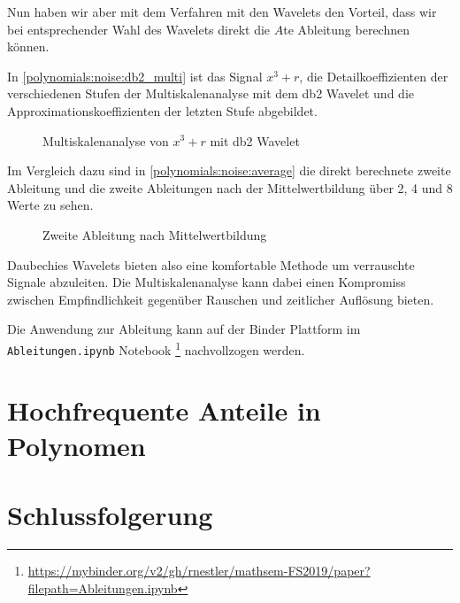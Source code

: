 \begin{refsection}
Nun haben wir aber mit dem Verfahren mit den Wavelets den Vorteil, dass wir bei
entsprechender Wahl des Wavelets direkt die $A$te Ableitung berechnen können.

In \autoref{polynomials:noise:db2_multi} ist das Signal $x^3 + r$, die
Detailkoeffizienten der verschiedenen Stufen der Multiskalenanalyse mit dem db2
Wavelet und die Approximationskoeffizienten der letzten Stufe abgebildet.

\begin{figure}
    \centering
    
    \caption{Multiskalenanalyse von $x^3 + r$ mit db2 Wavelet\label{polynomials:noise:db2_multi}}
\end{figure}

Im Vergleich dazu sind in \autoref{polynomials:noise:average} die direkt
berechnete zweite Ableitung und die zweite Ableitungen nach der
Mittelwertbildung über 2, 4 und 8 Werte zu sehen.

\begin{figure}
    \centering
    
    \caption{Zweite Ableitung nach Mittelwertbildung\label{polynomials:noise:average2nd}}
\end{figure}

Daubechies Wavelets bieten also eine komfortable Methode um verrauschte Signale
abzuleiten. Die Multiskalenanalyse kann dabei einen Kompromiss zwischen
Empfindlichkeit gegenüber Rauschen und zeitlicher Auflösung bieten.

Die Anwendung zur Ableitung kann auf der Binder Plattform im
\texttt{Ableitungen.ipynb} Notebook%
\footnote{\url{https://mybinder.org/v2/gh/rnestler/mathsem-FS2019/paper?filepath=Ableitungen.ipynb}}
nachvollzogen werden.

\section{Hochfrequente Anteile in Polynomen}

\section{Schlussfolgerung}

\printbibliography[heading=subbibliography]
\end{refsection}
